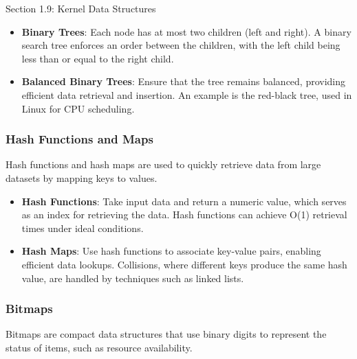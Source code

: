 \begin{notes}{Section 1.9: Kernel Data Structures}
    \begin{highlight}[Trees]
    
    \begin{itemize}
        \item \textbf{Binary Trees}: Each node has at most two children (left and right). A binary search tree enforces an order between the children, with the left child being less than or equal to the right child.
        \item \textbf{Balanced Binary Trees}: Ensure that the tree remains balanced, providing efficient data retrieval and insertion. An example is the red-black tree, used in Linux for CPU scheduling.
    \end{itemize}
    
    \end{highlight}
    
    \subsubsection*{Hash Functions and Maps}
    
    Hash functions and hash maps are used to quickly retrieve data from large datasets by mapping keys to values.
    
    \begin{highlight}
    
    \begin{itemize}
        \item \textbf{Hash Functions}: Take input data and return a numeric value, which serves as an index for retrieving the data. Hash functions can achieve O(1) retrieval times under ideal conditions.
        \item \textbf{Hash Maps}: Use hash functions to associate key-value pairs, enabling efficient data lookups. Collisions, where different keys produce the same hash value, are handled by techniques such as linked lists.
    \end{itemize}
    
    \end{highlight}
    
    \subsubsection*{Bitmaps}
    
    Bitmaps are compact data structures that use binary digits to represent the status of items, such as resource availability.
    

\end{notes}
